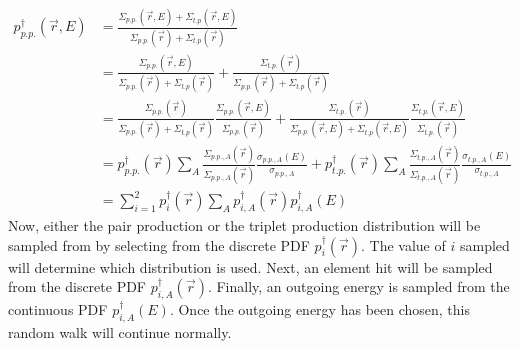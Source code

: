 \begin{align}
  p_{p.p.}^{\dagger}(\vec{r},E) & = 
  \frac{\Sigma_{p.p.}(\vec{r},E)+\Sigma_{t.p}(\vec{r},E)}
  {\Sigma_{p.p.}(\vec{r})+\Sigma_{t.p}(\vec{r})} \nonumber \\
  & = \frac{\Sigma_{p.p.}(\vec{r},E)}
  {\Sigma_{p.p.}(\vec{r})+\Sigma_{t.p}(\vec{r})} +
  \frac{\Sigma_{t.p.}(\vec{r})}
  {\Sigma_{p.p.}(\vec{r})+\Sigma_{t.p}(\vec{r})} \nonumber \\
  & = \frac{\Sigma_{p.p.}(\vec{r})}
  {\Sigma_{p.p.}(\vec{r})+\Sigma_{t.p}(\vec{r})} 
  \frac{\Sigma_{p.p.}(\vec{r},E)}{\Sigma_{p.p.}(\vec{r})} +
  \frac{\Sigma_{t.p.}(\vec{r})}
  {\Sigma_{p.p.}(\vec{r},E)+\Sigma_{t.p}(\vec{r},E)}
  \frac{\Sigma_{t.p.}(\vec{r},E)}{\Sigma_{t.p.}(\vec{r})} \nonumber \\
  & = p_{p.p.}^{\dagger}(\vec{r}) \sum_A
  \frac{\Sigma_{p.p.,A}(\vec{r})}{\Sigma_{p.p.,A}(\vec{r})}
  \frac{\sigma_{p.p.,A}(E)}{\sigma_{p.p.,A}} +
  p_{t.p.}^{\dagger}(\vec{r}) \sum_A
  \frac{\Sigma_{t.p.,A}(\vec{r})}{\Sigma_{t.p.,A}(\vec{r})}
  \frac{\sigma_{t.p.,A}(E)}{\sigma_{t.p.,A}} \nonumber \\
  & = \sum_{i=1}^2 p_i^{\dagger}(\vec{r})\sum_A p_{i,A}^{\dagger}(\vec{r})
  p_{i,A}^{\dagger}(E)
\end{align}
Now, either the pair production or the triplet production distribution will
be sampled from by selecting from the discrete PDF $p_i^{\dagger}(\vec{r})$. The
value of $i$ sampled will determine which distribution is used. Next, an 
element hit will be sampled from the discrete PDF $p_{i,A}^{\dagger}(\vec{r})$. 
Finally, an outgoing energy is sampled from the continuous PDF 
$p_{i,A}^{\dagger}(E)$. Once the outgoing energy has been chosen, this random 
walk will continue normally.

